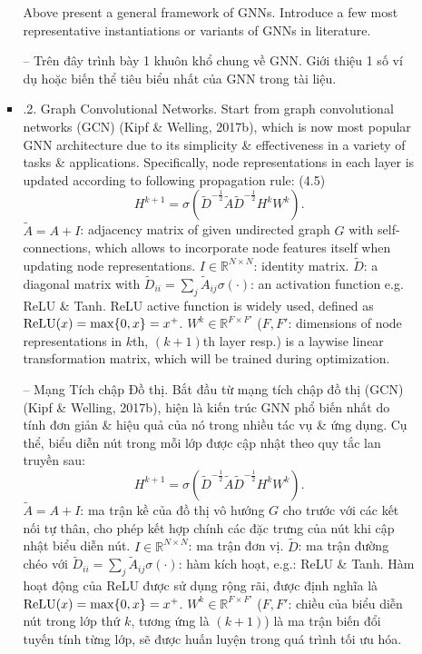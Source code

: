 \documentclass{article}
\begin{document}
\begin{itemize}
\begin{itemize}
\begin{itemize}
            Above present a general framework of GNNs. Introduce a few most representative instantiations or variants of GNNs in literature.

            -- Trên đây trình bày 1 khuôn khổ chung về GNN. Giới thiệu 1 số ví dụ hoặc biến thể tiêu biểu nhất của GNN trong tài liệu.
            \item {.2. Graph Convolutional Networks.} Start from graph convolutional networks (GCN) (Kipf \& Welling, 2017b), which is now most popular GNN architecture due to its simplicity \& effectiveness in a variety of tasks \& applications. Specifically, node representations in each layer is updated according to following propagation rule: (4.5)
            \begin{equation*}
                H^{k+1} = \sigma(\tilde{D}^{-\frac{1}{2}}\tilde{A}\tilde{D}^{-\frac{1}{2}}H^kW^k).
            \end{equation*}
            $\tilde{A} = A + I$: adjacency matrix of given undirected graph $G$ with self-connections, which allows to incorporate node features itself when updating node representations. $I\in\mathbb{R}^{N\times N}$: identity matrix. $\tilde{D}$: a diagonal matrix with $\tilde{D}_{ii} = \sum_j \tilde{A}_{ij}\sigma(\cdot)$: an activation function e.g. ReLU \& Tanh. ReLU active function is widely used, defined as ${\rm ReLU}(x) = \max\{0,x\} = x^+$. $W^k\in\mathbb{R}^{F\times F'}$ ($F,F'$: dimensions of node representations in $k$th, $(k + 1)$th layer resp.) is a laywise linear transformation matrix, which will be trained during optimization.

            -- {\sf Mạng Tích chập Đồ thị.} Bắt đầu từ mạng tích chập đồ thị (GCN) (Kipf \& Welling, 2017b), hiện là kiến trúc GNN phổ biến nhất do tính đơn giản \& hiệu quả của nó trong nhiều tác vụ \& ứng dụng. Cụ thể, biểu diễn nút trong mỗi lớp được cập nhật theo quy tắc lan truyền sau:
            \begin{equation*}
                H^{k+1} = \sigma(\tilde{D}^{-\frac{1}{2}}\tilde{A}\tilde{D}^{-\frac{1}{2}}H^kW^k).
            \end{equation*}
            $\tilde{A} = A + I$: ma trận kề của đồ thị vô hướng $G$ cho trước với các kết nối tự thân, cho phép kết hợp chính các đặc trưng của nút khi cập nhật biểu diễn nút. $I\in\mathbb{R}^{N\times N}$: ma trận đơn vị. $\tilde{D}$: ma trận đường chéo với $\tilde{D}_{ii} = \sum_j \tilde{A}_{ij}\sigma(\cdot)$: hàm kích hoạt, e.g.: ReLU \& Tanh. Hàm hoạt động của ReLU được sử dụng rộng rãi, được định nghĩa là ${\rm ReLU}(x) = \max\{0,x\} = x^+$. $W^k\in\mathbb{R}^{F\times F'}$ ($F,F'$: chiều của biểu diễn nút trong lớp thứ $k$, tương ứng là $(k + 1)$) là ma trận biến đổi tuyến tính từng lớp, sẽ được huấn luyện trong quá trình tối ưu hóa.


\end{itemize}
\end{itemize}
\end{itemize}
\end{document}

